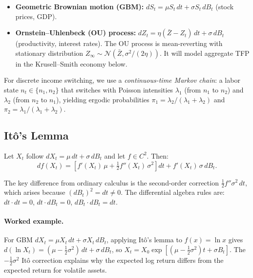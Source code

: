 \documentclass[11pt,a4paper]{report}
\begin{document}
\begin{itemize}[itemsep=2pt]
\item \textbf{Geometric Brownian motion (GBM):} $dS_t = \mu S_t\,dt + \sigma S_t\,dB_t$ (stock prices, GDP).
\item \textbf{Ornstein--Uhlenbeck (OU) process:} $dZ_t = \eta(\bar{Z} - Z_t)\,dt + \sigma\,dB_t$ (productivity, interest rates).  The OU process is mean-reverting with stationary distribution $Z_\infty \sim \mathcal{N}(\bar{Z}, \sigma^2/(2\eta))$.  It will model aggregate TFP in the Krusell--Smith economy below.
\end{itemize}

For discrete income switching, we use a \emph{continuous-time Markov chain}: a labor state $n_t \in \{n_1, n_2\}$ that switches with Poisson intensities $\lambda_1$ (from $n_1$ to $n_2$) and $\lambda_2$ (from $n_2$ to $n_1$), yielding ergodic probabilities $\pi_1 = \lambda_2/(\lambda_1 + \lambda_2)$ and $\pi_2 = \lambda_1/(\lambda_1 + \lambda_2)$.

\subsection{It\^o's Lemma}

\begin{definitionbox}[It\^o's Lemma]
Let $X_t$ follow $dX_t = \mu\,dt + \sigma\,dB_t$ and let $f \in C^2$.  Then:
\begin{equation}
df(X_t) = \left[f'(X_t)\,\mu + \tfrac{1}{2}f''(X_t)\,\sigma^2\right]dt + f'(X_t)\,\sigma\,dB_t.
\label{eq:ito_lemma}
\end{equation}
\end{definitionbox}

The key difference from ordinary calculus is the second-order correction $\tfrac{1}{2}f''\sigma^2\,dt$, which arises because $(dB_t)^2 = dt \neq 0$.  The differential algebra rules are: $dt \cdot dt = 0$, $dt \cdot dB_t = 0$, $dB_t \cdot dB_t = dt$.

\paragraph{Worked example.}  For GBM $dX_t = \mu X_t\,dt + \sigma X_t\,dB_t$, applying It\^o's lemma to $f(x) = \ln x$ gives $d(\ln X_t) = (\mu - \tfrac{1}{2}\sigma^2)\,dt + \sigma\,dB_t$, so $X_t = X_0\exp[(\mu - \tfrac{1}{2}\sigma^2)t + \sigma B_t]$.  The $-\tfrac{1}{2}\sigma^2$ It\^o correction explains why the expected log return differs from the expected return for volatile assets.
\end{document}
